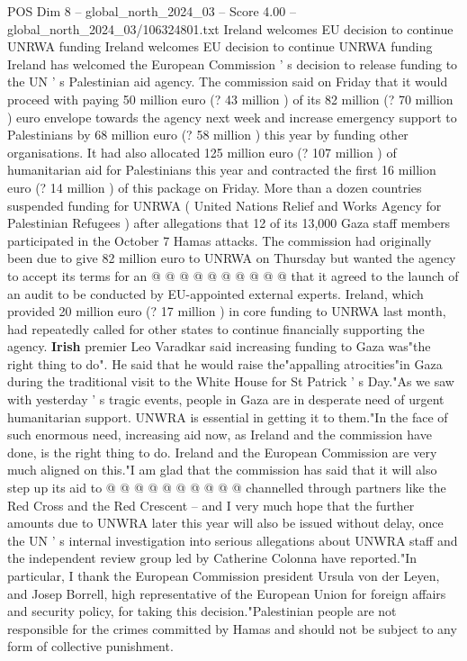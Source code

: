 \begin{textsample}{POS Dim 8 – global\_north\_2024\_03 – Score 4.00 – global\_north\_2024\_03/106324801.txt}  \label{ex:f8_pos_229}
Ireland welcomes EU decision to continue UNRWA funding Ireland welcomes EU decision to continue UNRWA funding Ireland has welcomed the European Commission ' s decision to release funding to the UN ' s Palestinian aid agency.
The commission said on Friday that it would proceed with paying 50 million euro (? 43 million ) of its 82 million (? 70 million ) euro envelope towards the agency next week and increase emergency support to Palestinians by 68 million euro (? 58 million ) this year by funding other organisations.
It had also allocated 125 million euro (? 107 million ) of humanitarian aid for Palestinians this year and contracted the first 16 million euro (? 14 million ) of this package on Friday.
More than a dozen countries suspended funding for UNRWA ( United Nations Relief and Works Agency for Palestinian Refugees ) after allegations that 12 of its 13,000 Gaza staff members participated in the October 7 Hamas attacks.
The commission had originally been due to give 82 million euro to UNRWA on Thursday but wanted the agency to accept its terms for an @ @ @ @ @ @ @ @ @ @ that it agreed to the launch of an audit to be conducted by EU-appointed external experts.
Ireland, which provided 20 million euro (? 17 million ) in core funding to UNRWA last month, had repeatedly called for other states to continue financially supporting the agency. \textbf{Irish} premier Leo Varadkar said increasing funding to Gaza was"the right thing to do".
He said that he would raise the"appalling atrocities"in Gaza during the traditional visit to the White House for St Patrick ' s Day."As we saw with yesterday ' s tragic events, people in Gaza are in desperate need of urgent humanitarian support.
UNWRA is essential in getting it to them."In the face of such enormous need, increasing aid now, as Ireland and the commission have done, is the right thing to do.
Ireland and the European Commission are very much aligned on this."I am glad that the commission has said that it will also step up its aid to @ @ @ @ @ @ @ @ @ @ channelled through partners like the Red Cross and the Red Crescent -- and I very much hope that the further amounts due to UNWRA later this year will also be issued without delay, once the UN ' s internal investigation into serious allegations about UNWRA staff and the independent review group led by Catherine Colonna have reported."In particular, I thank the European Commission president Ursula von der Leyen, and Josep Borrell, high representative of the European Union for foreign affairs and security policy, for taking this decision."Palestinian people are not responsible for the crimes committed by Hamas and should not be subject to any form of collective punishment.

\end{textsample}
